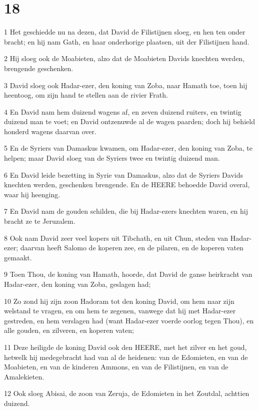 \chapter{18}

\par 1 Het geschiedde nu na dezen, dat David de Filistijnen sloeg, en hen ten onder bracht; en hij nam Gath, en haar onderhorige plaatsen, uit der Filistijnen hand.
\par 2 Hij sloeg ook de Moabieten, alzo dat de Moabieten Davids knechten werden, brengende geschenken.
\par 3 David sloeg ook Hadar-ezer, den koning van Zoba, naar Hamath toe, toen hij heentoog, om zijn hand te stellen aan de rivier Frath.
\par 4 En David nam hem duizend wagens af, en zeven duizend ruiters, en twintig duizend man te voet; en David ontzenuwde al de wagen paarden; doch hij behield honderd wagens daarvan over.
\par 5 En de Syriers van Damaskus kwamen, om Hadar-ezer, den koning van Zoba, te helpen; maar David sloeg van de Syriers twee en twintig duizend man.
\par 6 En David leide bezetting in Syrie van Damaskus, alzo dat de Syriers Davids knechten werden, geschenken brengende. En de HEERE behoedde David overal, waar hij heenging.
\par 7 En David nam de gouden schilden, die bij Hadar-ezers knechten waren, en hij bracht ze te Jeruzalem.
\par 8 Ook nam David zeer veel kopers uit Tibchath, en uit Chun, steden van Hadar-ezer; daarvan heeft Salomo de koperen zee, en de pilaren, en de koperen vaten gemaakt.
\par 9 Toen Thou, de koning van Hamath, hoorde, dat David de ganse heirkracht van Hadar-ezer, den koning van Zoba, geslagen had;
\par 10 Zo zond hij zijn zoon Hadoram tot den koning David, om hem naar zijn welstand te vragen, en om hem te zegenen, vanwege dat hij met Hadar-ezer gestreden, en hem verslagen had (want Hadar-ezer voerde oorlog tegen Thou), en alle gouden, en zilveren, en koperen vaten;
\par 11 Deze heiligde de koning David ook den HEERE, met het zilver en het goud, hetwelk hij medegebracht had van al de heidenen: van de Edomieten, en van de Moabieten, en van de kinderen Ammons, en van de Filistijnen, en van de Amalekieten.
\par 12 Ook sloeg Abisai, de zoon van Zeruja, de Edomieten in het Zoutdal, achttien duizend.
